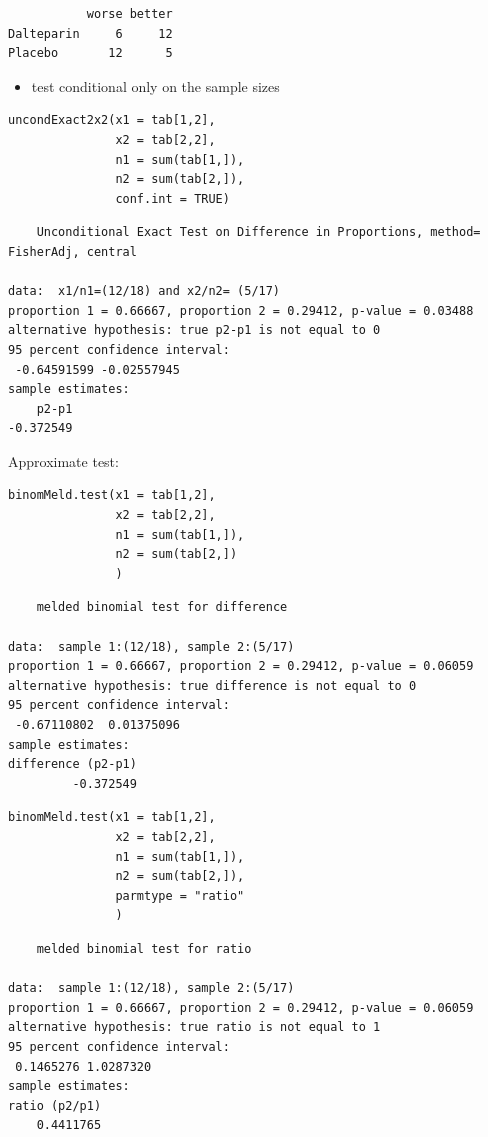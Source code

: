 \documentclass{article}
\begin{document}
\begin{verbatim}
           worse better
Dalteparin     6     12
Placebo       12      5
\end{verbatim}

\bigskip

\begin{itemize}
\item test conditional only on the sample sizes
\end{itemize}
\lstset{language=r,label= ,caption= ,captionpos=b,numbers=none}
\begin{lstlisting}
uncondExact2x2(x1 = tab[1,2],
			   x2 = tab[2,2],
			   n1 = sum(tab[1,]),
			   n2 = sum(tab[2,]),
			   conf.int = TRUE)
\end{lstlisting}

\begin{verbatim}
	Unconditional Exact Test on Difference in Proportions, method= FisherAdj, central

data:  x1/n1=(12/18) and x2/n2= (5/17)
proportion 1 = 0.66667, proportion 2 = 0.29412, p-value = 0.03488
alternative hypothesis: true p2-p1 is not equal to 0
95 percent confidence interval:
 -0.64591599 -0.02557945
sample estimates:
    p2-p1 
-0.372549
\end{verbatim}

Approximate test:
\lstset{language=r,label= ,caption= ,captionpos=b,numbers=none}
\begin{lstlisting}
binomMeld.test(x1 = tab[1,2],
			   x2 = tab[2,2],
			   n1 = sum(tab[1,]),
			   n2 = sum(tab[2,])
			   )
\end{lstlisting}

\begin{verbatim}
	melded binomial test for difference

data:  sample 1:(12/18), sample 2:(5/17)
proportion 1 = 0.66667, proportion 2 = 0.29412, p-value = 0.06059
alternative hypothesis: true difference is not equal to 0
95 percent confidence interval:
 -0.67110802  0.01375096
sample estimates:
difference (p2-p1) 
         -0.372549
\end{verbatim}

\lstset{language=r,label= ,caption= ,captionpos=b,numbers=none}
\begin{lstlisting}
binomMeld.test(x1 = tab[1,2],
			   x2 = tab[2,2],
			   n1 = sum(tab[1,]),
			   n2 = sum(tab[2,]),
			   parmtype = "ratio"
			   )
\end{lstlisting}

\begin{verbatim}
	melded binomial test for ratio

data:  sample 1:(12/18), sample 2:(5/17)
proportion 1 = 0.66667, proportion 2 = 0.29412, p-value = 0.06059
alternative hypothesis: true ratio is not equal to 1
95 percent confidence interval:
 0.1465276 1.0287320
sample estimates:
ratio (p2/p1) 
    0.4411765
\end{verbatim}
\end{document}
